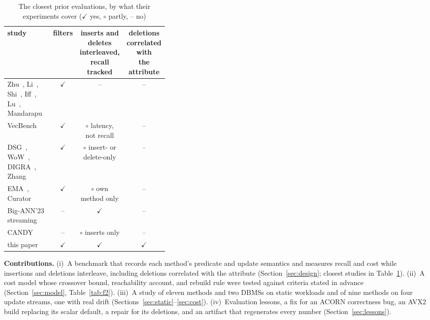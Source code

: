 \documentclass[conference]{IEEEtran}
\begin{document}
\begin{table}[t]\centering\footnotesize\setlength{\tabcolsep}{2pt}
\caption{The closest prior evaluations, by what their experiments cover ($\checkmark$ yes, $\circ$ partly, -- no)}\label{tab:novelty}
\begin{tabular}{@{}p{0.385\linewidth}ccc@{}}\toprule
study & filters & \makecell{inserts and deletes\\ interleaved,\\ recall tracked} & \makecell{deletions\\ correlated with\\ the attribute} \\\midrule
Zhu~\cite{zhu2025hybrid}, Li~\cite{li2025attr}, Shi~\cite{shi2025fanns}, Iff~\cite{iff2026fanns}, Lu~\cite{lu2026pg}, Mandarapu~\cite{mandarapu2026} & $\checkmark$ & -- & -- \\
VecBench~\cite{vecbench} & $\checkmark$ & $\circ$ latency, not recall & -- \\
DSG~\cite{dsg}, WoW~\cite{wow}, DIGRA~\cite{digra}, Zhang~\cite{zhang2025dyn} & $\checkmark$ & $\circ$ insert- or delete-only & -- \\
EMA~\cite{ema}, Curator~\cite{curator} & $\checkmark$ & $\circ$ own method only & -- \\
Big-ANN'23 streaming~\cite{bigann23} & -- & $\checkmark$ & -- \\
CANDY~\cite{candy} & -- & $\circ$ inserts only & -- \\
this paper & $\checkmark$ & $\checkmark$ & $\checkmark$ \\\bottomrule
\end{tabular}\end{table}

\textbf{Contributions.} (i)~A benchmark that records each method's predicate and update semantics and measures recall and cost while insertions and deletions interleave, including deletions correlated with the attribute (Section~\ref{sec:design}; closest studies in Table~\ref{tab:novelty}). (ii)~A cost model whose crossover bound, reachability account, and rebuild rule were tested against criteria stated in advance (Section~\ref{sec:model}, Table~\ref{tab:f2}). (iii)~A study of eleven methods and two DBMSs on static workloads and of nine methods on four update streams, one with real drift (Sections~\ref{sec:static}--\ref{sec:cost}). (iv)~Evaluation lessons, a fix for an ACORN correctness bug, an AVX2 build replacing its scalar default, a repair for its deletions, and an artifact that regenerates every number (Section~\ref{sec:lessons}).
\end{document}
